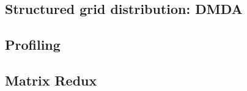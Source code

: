 \documentclass{beamer}
\begin{document}
\subsection{Structured grid distribution: DMDA}












\subsection{Profiling}




\subsection{Matrix Redux}







\end{document}
